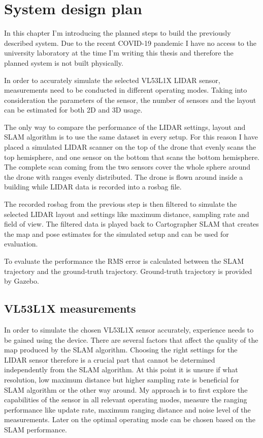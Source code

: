 \chapter{System design plan} \label{chap:system_design}
In this chapter I'm introducing the planned steps to build the previously described system. Due to the 
recent COVID-19 pandemic I have no access to the university laboratory at the time I'm writing this thesis and 
therefore the planned system is not built physically. 

In order to accurately simulate the selected VL53L1X LIDAR sensor, measurements need to be conducted in different 
operating modes. Taking into consideration the parameters of the sensor, the number of sensors and the layout 
can be estimated for both 2D and 3D usage.

The only way to compare the performance of the LIDAR settings, layout and SLAM algorithm is to use the same
dataset in every setup. For this reason I have placed a simulated LIDAR scanner on the top of the drone 
that evenly scans the top hemisphere, and one sensor on the bottom that scans the bottom hemisphere. 
The complete scan coming from the two sensors cover the whole sphere around the drone with ranges evenly
distributed. The drone is flown around inside a building while LIDAR data is recorded into a rosbag file.

The recorded rosbag from the previous step is then filtered to simulate the selected LIDAR layout and settings
like maximum distance, sampling rate and field of view. The filtered data is played back to Cartographer SLAM
that creates the map and pose estimates for the simulated setup and can be used for evaluation.

To evaluate the performance the RMS error is calculated between the SLAM trajectory and the ground-truth
trajectory. Ground-truth trajectory is provided by Gazebo.



\section{VL53L1X measurements} \label{sect:vl53l1x_measurements}
In order to simulate the chosen VL53L1X sensor accurately, experience needs to be gained using the device. 
There are several factors that affect the quality of the map produced by the SLAM algorithm. Choosing the right
settings for the LIDAR sensor therefore is a crucial part that cannot be determined independently from the SLAM 
algorithm. At this point it is unsure if what resolution, low maximum distance but higher sampling rate is beneficial 
for SLAM algorithm or the other way around. My approach is to first explore the capabilities of the sensor in 
all relevant operating modes, measure the ranging performance like update rate, maximum ranging distance and 
noise level of the measurements. Later on the optimal operating mode can be chosen based on the SLAM performance. 

